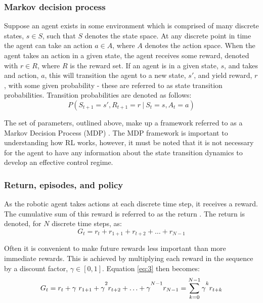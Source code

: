 \subsubsection{Markov decision process}
Suppose an agent exists in some environment which is comprised of many discrete states, $s \in S$, such that $S$ denotes the state space. At any discrete point in time the agent can take an action $a \in A$, where $A$ denotes the action space. When the agent takes an action in a given state, the agent receives some reward, denoted with $r \in R$, where $R$ is the reward set. If an agent is in a given state, $s$, and takes and action, $a$, this will transition the agent to a new state, $s'$, and yield reward, $r$, with some given probability - these are referred to as state transition probabilities. Transition probabilities are denoted as follows:
\begin{equation}
P(S_{t+1}=s', R_{t+1}=r \ | \ S_t = s, A_t = a)\label{eq:2}
\end{equation}

The set of parameters, outlined above, make up a framework referred to as a Markov Decision Process (MDP) \cite{Bellm1957}. The MDP framework is important to understanding how RL works, however, it must be noted that it is not necessary for the agent to have any information about the state transition dynamics to develop an effective control regime.

\subsubsection{Return, episodes, and policy}
As the robotic agent takes actions at each discrete time step, it receives a reward. The cumulative sum of this reward is referred to as the return \cite{openai2018}. The return is denoted, for $N$ discrete time steps, as:
\begin{equation}
G_t = r_t + r_{1+1} + r_{t+2} + \ldots + r_{N-1}\label{eq:3}
\end{equation}

Often it is convenient to make future rewards less important than more immediate rewards. This is achieved by multiplying each reward in the sequence by a discount factor, $\gamma \in [0,1]$. Equation \ref{eq:3} then becomes:
\begin{equation}
G_t = r_t + \gamma \ r_{1+1} + \gamma\mystrut^2 r_{t+2} + \ldots + \gamma\mystrut^{N-1} r_{N-1} = \sum_{k = 0}^{N-1} \gamma\mystrut^k r_{t+k}
\end{equation}

